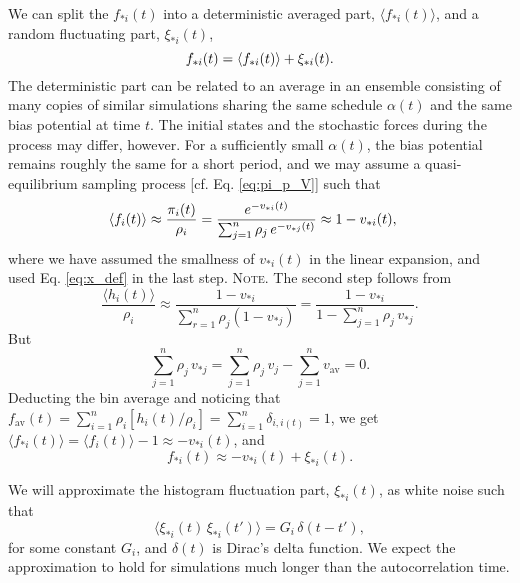 \documentclass[preprint, superscriptaddress, floatfix]{revtex4-1}
\newcommand{\note}[1]{{\color{DarkGreen}\footnotesize \textsc{Note.} #1}}
\newcommand{\bav}[1]{#1_\mathrm{av}}
\begin{document}
We can split the $f_{*i}(t)$ into
a deterministic averaged part, $\langle f_{*i}(t) \rangle$,
and a random fluctuating part, $\xi_{*i}(t)$,
%
\begin{equation}
  f_{*i}(t) =
  \langle f_{*i}(t) \rangle
  +
  \xi_{*i}(t)
  .
  \notag
\end{equation}
%
The deterministic part can be related
to an average in an ensemble consisting of
many copies of similar simulations
sharing the same schedule $\alpha(t)$
and the same bias potential at time $t$.
%
The initial states and the stochastic forces
during the process may differ, however.
%
For a sufficiently small $\alpha(t)$,
the bias potential remains roughly the same for a short period,
and we may assume a quasi-equilibrium sampling process
[cf. Eq. \eqref{eq:pi_p_V}]
such that
%
\begin{align}
  \langle f_i(t) \rangle
  &\approx
  \frac{ \pi_i(t) } { \rho_i }
  =
  \frac{                          e^{-v_{*i}(t)} }
       { \sum_{j = 1}^n \rho_j \, e^{-v_{*j}(t)} }
  \approx
  1 - v_{*i}(t)
  ,
  \notag
\end{align}
%
where we have assumed the smallness
of $v_{*i}(t)$ in the linear expansion,
and used Eq. \eqref{eq:x_def} in the last step.
%
\note{
The second step follows from
$$
\frac{ \langle h_i(t) \rangle }
     { \rho_i }
\approx
\frac{                       1 - v_{*i}  }
     { \sum_{ r = 1 }^n \rho_j (1 - v_{*j}) }
=
\frac{                       1 - v_{*i}  }
     { 1 - \sum_{ j = 1 }^n \rho_j \, v_{*j} }
.
$$
But
$$
\sum_{ j = 1 }^n \rho_j \, v_{*j}
=
\sum_{ j = 1 }^n \rho_j \, v_j - \sum_{j=1}^n \bav{v}  = 0.
$$
}%
%
Deducting the bin average
and noticing that
$\bav{f}(t) = \sum_{i=1}^n \rho_i [h_i(t)/\rho_i] = \sum_{i=1}^n \delta_{i, i(t)} = 1$,
we get
$\langle f_{*i}(t) \rangle = \langle f_i(t) \rangle - 1 \approx - v_{*i}(t)$,
%
%
and
%
\begin{equation}
  f_{*i}(t) \approx - v_{*i}(t) + \xi_{*i}(t)
  .
  \label{eq:sh_ave}
\end{equation}


We will approximate the histogram fluctuation part, $\xi_{*i}(t)$,
as white noise such that
%
\begin{equation}
  \bigl\langle \xi_{*i}(t) \, \xi_{*i}(t') \bigr\rangle
  = G_i \, \delta(t - t')
  ,
  \label{eq:Gi_def}
\end{equation}
%
for some constant $G_i$,
and $\delta(t)$ is Dirac's delta function.
%
We expect the approximation to hold
for simulations much longer than the autocorrelation time.
\end{document}

